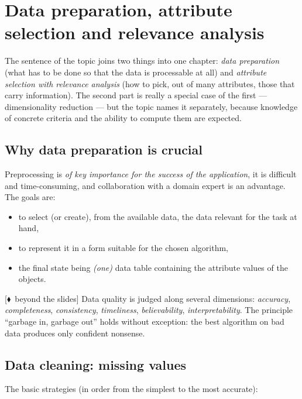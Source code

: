 \documentclass[11pt,a4paper]{article}
\theoremstyle{definition}
\providecommand{\uv}[1]{``#1''}
\newcommand{\mimo}{\textcolor{markcol}{\textsf{\footnotesize[$\blacklozenge$~beyond the slides]}}}
\begin{document}
\newpage
\section{Data preparation, attribute selection and relevance analysis}
\label{sec:priprava}

The sentence of the topic joins two things into one chapter: \emph{data preparation} (what has
to be done so that the data is processable at all) and \emph{attribute selection with relevance
analysis} (how to pick, out of many attributes, those that carry information). The second part
is really a special case of the first --- dimensionality reduction --- but the topic names it
separately, because knowledge of concrete criteria and the ability to compute them are expected.

\subsection{Why data preparation is crucial}

Preprocessing is \emph{of key importance for the success of the application}, it is difficult and
time-consuming, and collaboration with a domain expert is an advantage. The goals are:
\begin{itemize}
\item to select (or create), from the available data, the data relevant for the task at hand,
\item to represent it in a form suitable for the chosen algorithm,
\item the final state being \emph{(one)} data table containing the attribute values of the
      objects.
\end{itemize}

\mimo{} Data quality is judged along several dimensions: \emph{accuracy}, \emph{completeness},
\emph{consistency}, \emph{timeliness}, \emph{believability}, \emph{interpretability}. The
principle \uv{garbage in, garbage out} holds without exception: the best algorithm on bad data
produces only confident nonsense.

\subsection{Data cleaning: missing values}

The basic strategies (in order from the simplest to the most accurate):
\end{document}
